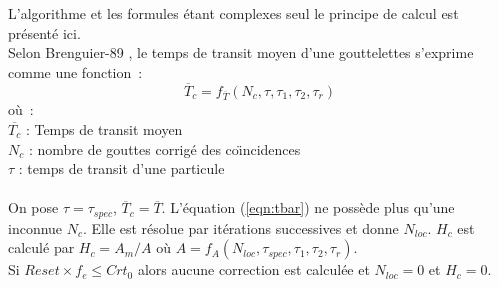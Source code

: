L'algorithme et les formules \'etant complexes
seul le principe de calcul est pr\'esent\'e ici.\\
Selon Brenguier-89 \cite{Brenguier-89}, le
temps de transit moyen d'une gouttelettes   
s'exprime comme une fonction~: \\ 
\begin{equation}
\overline{T}_c = f_{\overline{T}} ( N_c, \tau, \tau_1, \tau_2, \tau_r )
\label{eqn:tbar}  
\end{equation}
o\`u~:\\
$\overline{T_c} $ : Temps de transit moyen \\
$N_c$ : nombre de gouttes corrig\'e des
co\"{\i}ncidences \\
$\tau $ : temps de transit d'une particule \\
\\
On pose $\tau = \tau_{spec}$, $\overline{T}_c = \overline{T}$.
L'\'equation (\ref{eqn:tbar}) ne poss\`ede plus qu'une inconnue $N_c$. 
Elle est r\'esolue par it\'erations successives et donne  
$N_{loc}$.  $H_c$ est calcul\'e par
$H_c = A_m/A$ o\`u 
$A = f_A(N_{loc}, \tau_{spec}, \tau_1, \tau_2, \tau_r )$.\\ 
Si $Reset\times f_e \le Crt_0$ alors aucune correction
est calcul\'ee et $N_{loc}=0$ et $H_c=0$.
